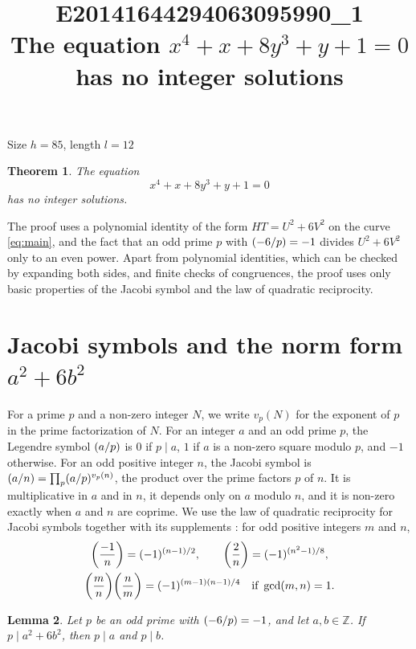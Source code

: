 \documentclass[11pt]{article}
\title{\textbf{E20141644294063095990\_1}\\[4pt] {\Large The equation $x^{4}+x+8y^{3}+y+1=0$ has no integer solutions}}
\author{}
\date{}
\newtheorem{theorem}{Theorem}
\newtheorem{lemma}[theorem]{Lemma}
\newcommand{\Z}{\mathbb{Z}}
\newcommand{\leg}[2]{\mathchoice{\biggl(\dfrac{#1}{#2}\biggr)}{(#1/#2)}{(#1/#2)}{(#1/#2)}}
\begin{document}
\maketitle
\vspace{-8ex}
\begin{center}
Size $h=85$, length $l=12$
\end{center}

\begin{theorem}\label{thm:main}
The equation
\begin{equation}\label{eq:main}
x^{4}+x+8y^{3}+y+1=0
\end{equation}
has no integer solutions.
\end{theorem}

The proof uses a polynomial identity of the form $HT=U^2+6V^2$ on the curve \eqref{eq:main}, and the fact that an odd prime $p$ with $\leg{-6}{p}=-1$ divides $U^2+6V^2$ only to an even power. Apart from polynomial identities, which can be checked by expanding both sides, and finite checks of congruences, the proof uses only basic properties of the Jacobi symbol and the law of quadratic reciprocity.

\section{\texorpdfstring{Jacobi symbols and the norm form $a^2+6b^2$}{Jacobi symbols and the norm form}}

For a prime $p$ and a non-zero integer $N$, we write $v_p(N)$ for the exponent of $p$ in the prime factorization of $N$. For an integer $a$ and an odd prime $p$, the Legendre symbol $\leg{a}{p}$ is $0$ if $p\mid a$, $1$ if $a$ is a non-zero square modulo $p$, and $-1$ otherwise. For an odd positive integer $n$, the Jacobi symbol is $\leg{a}{n}=\prod_p\leg{a}{p}^{v_p(n)}$, the product over the prime factors $p$ of $n$. It is multiplicative in $a$ and in $n$, it depends only on $a$ modulo $n$, and it is non-zero exactly when $a$ and $n$ are coprime. We use the law of quadratic reciprocity for Jacobi symbols together with its supplements \cite[Chapter~5, \S2]{IR}: for odd positive integers $m$ and $n$,
\begin{gather*}
\leg{-1}{n}=(-1)^{(n-1)/2},\qquad\leg{2}{n}=(-1)^{(n^2-1)/8},\\
\leg{m}{n}\leg{n}{m}=(-1)^{(m-1)(n-1)/4}\quad\text{if }\gcd(m,n)=1.
\end{gather*}

\begin{lemma}\label{lem:divides}
Let $p$ be an odd prime with $\leg{-6}{p}=-1$, and let $a,b\in\Z$. If $p\mid a^2+6b^2$, then $p\mid a$ and $p\mid b$.
\end{lemma}
\end{document}
